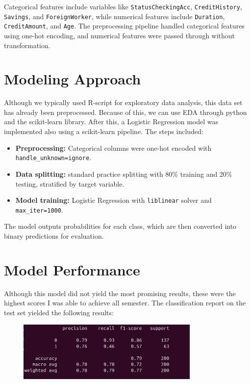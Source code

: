 \documentclass[12pt]{article}
\begin{document}
	Categorical features include variables like \texttt{StatusCheckingAcc}, \texttt{CreditHistory}, \texttt{Savings}, and \texttt{ForeignWorker}, while numerical features include \texttt{Duration}, \texttt{CreditAmount}, and \texttt{Age}. The preprocessing pipeline handled categorical features using one-hot encoding, and numerical features were passed through without transformation.
	
	\section{Modeling Approach}
	Although we typically used R-script for exploratory data analysis, this data set has already been preprocessed. Because of this, we can use EDA through python and the scikit-learn library. After this, a Logistic Regression model was implemented also using a scikit-learn pipeline. The steps included:
	\begin{itemize}
		\item \textbf{Preprocessing:} Categorical columns were one-hot encoded with \texttt{handle\_unknown=\textquotesingle ignore\textquotesingle}.
		\item \textbf{Data splitting:} standard practice splitting with 80\% training and 20\% testing, stratified by target variable.
		\item \textbf{Model training:} Logistic Regression with \texttt{liblinear} solver and \texttt{max\_iter=1000}.
	\end{itemize}
	
	The model outputs probabilities for each class, which are then converted into binary predictions for evaluation.
	
	\section{Model Performance}
	Although this model did not yield the most promising results, these were the highest scores I was able to achieve all semester. The classification report on the test set yielded the following results:\newpage
	
	\begin{figure}[h]
		\centering
		\includegraphics[width=0.8\textwidth]{AccScores.png}
		\label{fig:acc_scores}
	\end{figure}
	
\end{document}
